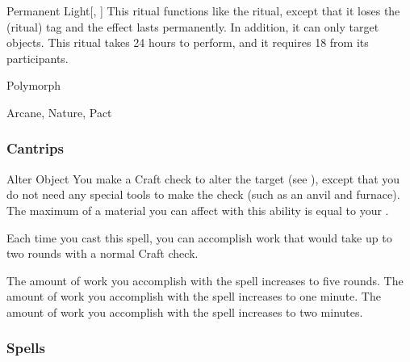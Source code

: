 \lowercase{\hypertarget{spell:Permanent Light}{}}\label{spell:Permanent Light}
\begin{freeability}[Rank 3]{\hypertarget{spell:Permanent Light}{Permanent Light}}[, ]
This ritual functions like the  ritual, except that it loses the  (ritual) tag and the effect lasts permanently.
In addition, it can only target objects.
This ritual takes 24 hours to perform, and it requires 18  from its participants.
\end{freeability}
\vspace{0.25em}


\newpage
\begin{spellsection}{Polymorph}

\begin{spellheader}
\end{spellheader}


 Arcane, Nature, Pact

\subsubsection{Cantrips}


\begin{freeability}{Alter Object}
You make a Craft check to alter the target (see ), except that you do not need any special tools to make the check (such as an anvil and furnace).
The maximum  of a material you can affect with this ability is equal to your .

Each time you cast this spell, you can accomplish work that would take up to two rounds with a normal Craft check.

\rankline
{} The amount of work you accomplish with the spell increases to five rounds.
 The amount of work you accomplish with the spell increases to one minute.
 The amount of work you accomplish with the spell increases to two minutes.
\end{freeability}

\end{spellsection}


\subsubsection{Spells}


